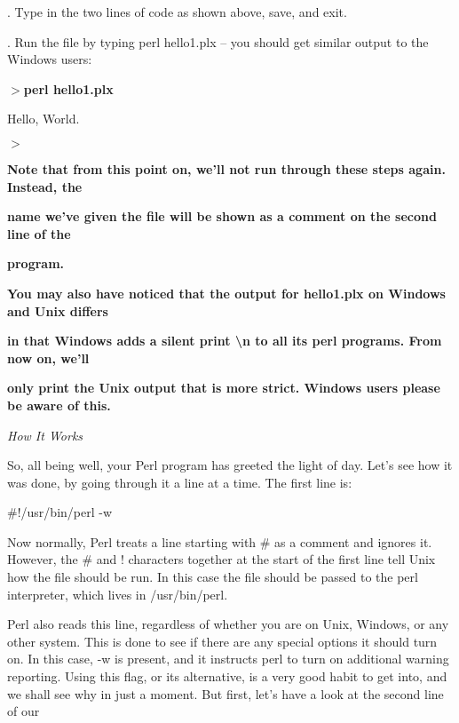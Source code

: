 \documentclass[a4paper,11pt]{book}
\begin{document}
\noindent 

.   Type in the two lines of code as shown above, save, and exit.

\noindent 

.   Run the file by typing perl hello1.plx -- you should get similar output to the Windows users:

\noindent 

\noindent $>$\textbf{perl hello1.plx}

\noindent Hello, World.

\noindent $>$

\noindent 

\noindent 

\noindent \textbf{Note that from this point on, we'll not run through these steps again. Instead, the}

\noindent \textbf{name we've given the file will be shown as a comment on the second line of the}

\noindent \textbf{program.}

\noindent 

\noindent \textbf{You may also have noticed that the output for hello1.plx on Windows and Unix differs}

\noindent \textbf{in that Windows adds a silent print \textbackslash n to all its perl programs. From now on, we'll}

\noindent \textbf{only print the Unix output that is more strict. Windows users please be aware of this.}

\noindent 

\noindent 

\noindent \textit{How It Works}

\noindent So, all being well, your Perl program has greeted the light of day. Let's see how it was done, by going through it a line at a time. The first line is:

\noindent 

\noindent 

\noindent \#!/usr/bin/perl -w

\noindent 

\noindent Now normally, Perl treats a line starting with \# as a comment and ignores it. However, the \# and ! characters together at the start of the first line tell Unix how the file should be run. In this case the file should be passed to the perl interpreter, which lives in /usr/bin/perl.

\noindent 

\noindent Perl also reads this line, regardless of whether you are on Unix, Windows, or any other system. This is done to see if there are any special options it should turn on. In this case, -w is present, and it instructs perl to turn on additional warning reporting. Using this flag, or its alternative, is a very good habit to get into, and we shall see why in just a moment. But first, let's have a look at the second line of our
\end{document}
